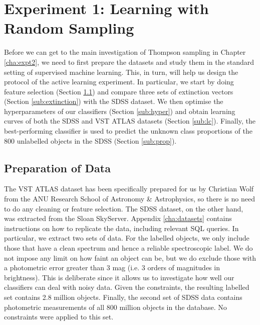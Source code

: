 
\chapter{Experiment 1: Learning with Random Sampling}
\label{cha:expt1}

Before we can get to the main investigation of Thompson sampling in Chapter \ref{cha:expt2}, we
need to first prepare the datasets and study them in the standard setting of supervised machine
learning. This, in turn, will help us design the protocol of the active learning experiment. In
particular, we start by doing feature selection (Section \ref{sec:prep}) and compare three sets of
extinction vectors (Section \ref{sub:extinction}) with the SDSS dataset. We then optimise the
hyperparameters of our classifiers (Section \ref{sub:hyper}) and obtain learning curves of both the
SDSS and VST ATLAS datasets (Section \ref{sub:lc}). Finally, the best-performing classifier is used
to predict the unknown class proportions of the 800 unlabelled objects in the SDSS (Section
\ref{sub:prop}).


\section{Preparation of Data}
\label{sec:prep}

The VST ATLAS dataset has been specifically prepared for us by Christian Wolf from the ANU Research
School of Astronomy \& Astrophysics, so there is no need to do any cleaning or feature selection.
The SDSS dataset, on the other hand, was extracted from the Sloan SkyServer. Appendix
\ref{cha:datasets} contains instructions on how to replicate the data, including relevant SQL
queries. In particular, we extract two sets of data. For the labelled objects, we only include
those that have a clean spectrum and hence a reliable spectroscopic label. We do not impose any
limit on how faint an object can be, but we do exclude those with a photometric error greater than
3 mag (i.e. 3 orders of magnitudes in brightness). This is deliberate since it allows us to
investigate how well our classifiers can deal with noisy data. Given the constraints, the resulting
labelled set contains 2.8 million objects. Finally, the second set of SDSS data contains
photometric measurements of all 800 million objects in the database. No constraints were applied to
this set.

